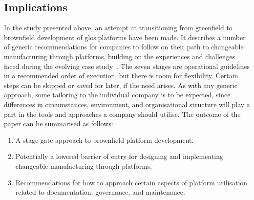 \subsection{Implications}
In the study presented above, an attempt at transitioning from greenfield to brownfield development of \gls{glos:platform}s have been made.
It describes a number of generic recommendations for companies to follow on their path to changeable manufacturing through platforms, building on the experiences and challenges faced during the evolving case study~\parencite{SorensenAPMS2018}.
The seven stages are operational guidelines in a recommended order of execution, but there is room for flexibility.
Certain steps can be skipped or saved for later, if the need arises.
As with any generic approach, some tailoring to the individual company is to be expected, since differences in circumstances, environment, and organisational structure \etc{} will play a part in the tools and approaches a company should utilise.
The outcome of the paper can be summarised as follows:
\begin{enumerate}
  \item A stage-gate approach to brownfield platform development.
  \item Potentially a lowered barrier of entry for designing and implementing changeable manufacturing through platforms.
  \item Recommendations for how to approach certain aspects of platform utilisation related to documentation, governance, and maintenance.
\end{enumerate}